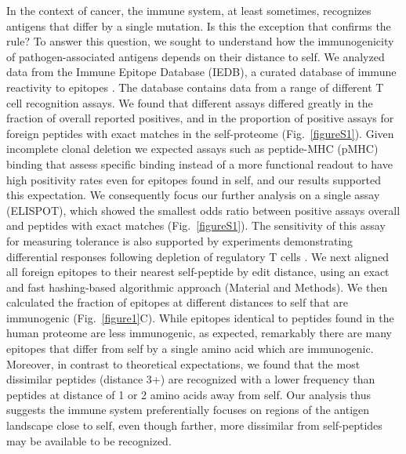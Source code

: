 \documentclass[superscriptaddress,twocolumn,pre]{revtex4}
\newcommand{\<}{\langle}
\renewcommand{\>}{\rangle}
\begin{document}
In the context of cancer, the immune system, at least sometimes, recognizes antigens that differ by a single mutation. Is this the exception that confirms the rule? To answer this question, we sought to understand how the immunogenicity of pathogen-associated antigens depends on their distance to self. We analyzed data from the Immune Epitope Database (IEDB), a curated database of immune reactivity to epitopes \cite{Vita2019}. The database contains data from a range of different T cell recognition assays. We found that different assays differed greatly in the fraction of overall reported positives, and in the proportion of positive assays for foreign peptides with exact matches in the self-proteome (Fig.~\ref{figureS1}). Given incomplete clonal deletion we expected assays such as peptide-MHC (pMHC) binding that assess specific binding instead of a more functional readout to have high positivity rates even for epitopes found in self, and our results supported this expectation. We consequently focus our further analysis on a single assay (ELISPOT), which showed the smallest odds ratio between positive assays overall and peptides with exact matches (Fig.~\ref{figureS1}). The sensitivity of this assay for measuring tolerance is also supported by experiments demonstrating differential responses following depletion of regulatory T cells \cite{Bonertz2009}. We next aligned all foreign epitopes to their nearest self-peptide by edit distance, using an exact and fast hashing-based algorithmic approach (Material and Methods). We then calculated the fraction of epitopes at different distances to self that are immunogenic (Fig.~\ref{figure1}C). While epitopes identical to peptides found in the human proteome are less immunogenic, as expected, remarkably there are many epitopes that differ from self by a single amino acid which are immunogenic. Moreover, in contrast to theoretical expectations, we found that the most dissimilar peptides (distance 3+) are recognized with a lower frequency than peptides at distance of 1 or 2 amino acids away from self. Our analysis thus suggests the immune system preferentially focuses on regions of the antigen landscape close to self, even though farther, more dissimilar from self-peptides may be available to be recognized.
\end{document}
